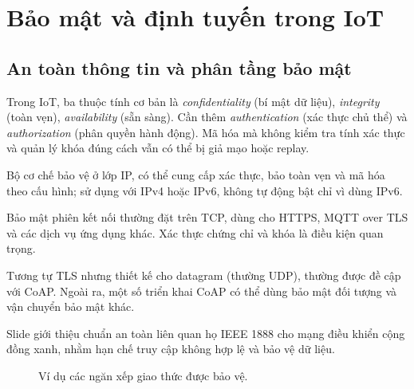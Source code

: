 \section{Bảo mật và định tuyến trong IoT}
\subsection{An toàn thông tin và phân tầng bảo mật}
Trong IoT, ba thuộc tính cơ bản là \emph{confidentiality} (bí mật dữ liệu), \emph{integrity} (toàn vẹn), \emph{availability} (sẵn sàng). Cần thêm \emph{authentication} (xác thực chủ thể) và \emph{authorization} (phân quyền hành động). Mã hóa mà không kiểm tra tính xác thực và quản lý khóa đúng cách vẫn có thể bị giả mạo hoặc replay.
\begin{description}[style=nextline]
\item[IPsec.] Bộ cơ chế bảo vệ ở lớp IP, có thể cung cấp xác thực, bảo toàn vẹn và mã hóa theo cấu hình; sử dụng với IPv4 hoặc IPv6, không tự động bật chỉ vì dùng IPv6.
\item[TLS.] Bảo mật phiên kết nối thường đặt trên TCP, dùng cho HTTPS, MQTT over TLS và các dịch vụ ứng dụng khác. Xác thực chứng chỉ và khóa là điều kiện quan trọng.
\item[DTLS.] Tương tự TLS nhưng thiết kế cho datagram (thường UDP), thường được đề cập với CoAP. Ngoài ra, một số triển khai CoAP có thể dùng bảo mật đối tượng và vận chuyển bảo mật khác.
\item[IEEE 1888.3.] Slide giới thiệu chuẩn an toàn liên quan họ IEEE 1888 cho mạng điều khiển cộng đồng xanh, nhằm hạn chế truy cập không hợp lệ và bảo vệ dữ liệu.
\end{description}
\begin{figure}[htbp]\centering
{}\caption{Ví dụ các ngăn xếp giao thức được bảo vệ.}
\end{figure}

